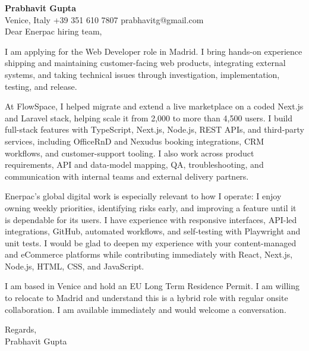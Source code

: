 \documentclass[a4paper,10.5pt]{article}
\begin{document}
\textbf{Prabhavit Gupta}\\
Venice, Italy \textbar{} +39 351 610 7807 \textbar{} prabhavitg@gmail.com\\[10pt]
Dear Enerpac hiring team,

I am applying for the Web Developer role in Madrid. I bring hands-on experience shipping and maintaining customer-facing web products, integrating external systems, and taking technical issues through investigation, implementation, testing, and release.

At FlowSpace, I helped migrate and extend a live marketplace on a coded Next.js and Laravel stack, helping scale it from 2,000 to more than 4,500 users. I build full-stack features with TypeScript, Next.js, Node.js, REST APIs, and third-party services, including OfficeRnD and Nexudus booking integrations, CRM workflows, and customer-support tooling. I also work across product requirements, API and data-model mapping, QA, troubleshooting, and communication with internal teams and external delivery partners.

Enerpac's global digital work is especially relevant to how I operate: I enjoy owning weekly priorities, identifying risks early, and improving a feature until it is dependable for its users. I have experience with responsive interfaces, API-led integrations, GitHub, automated workflows, and self-testing with Playwright and unit tests. I would be glad to deepen my experience with your content-managed and eCommerce platforms while contributing immediately with React, Next.js, Node.js, HTML, CSS, and JavaScript.

I am based in Venice and hold an EU Long Term Residence Permit. I am willing to relocate to Madrid and understand this is a hybrid role with regular onsite collaboration. I am available immediately and would welcome a conversation.

Regards,\\
Prabhavit Gupta
\end{document}
